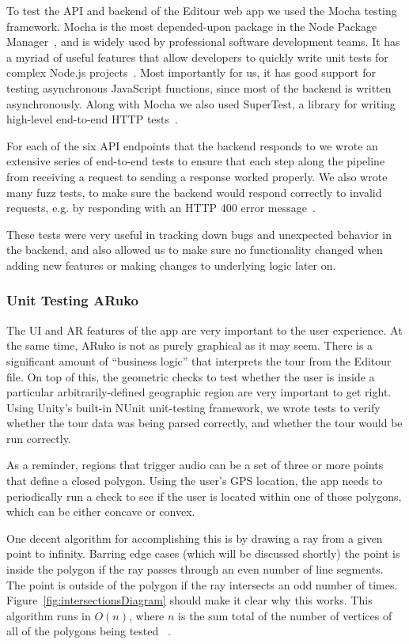 \documentclass[a4paper, 10pt, american, titlepage]{article}
\begin{document}
To test the API and backend of the Editour web app we used the Mocha testing
framework. Mocha is the most depended-upon package in the Node Package
Manager~\autocite{tidelift2019}, and is widely used by professional software
development teams. It has a myriad of useful features that allow developers to
quickly write unit tests for complex Node.js projects~\autocite{mochajs2019}.
Most importantly for us, it has good support for testing asynchronous JavaScript
functions, since most of the backend is written asynchronously. Along with Mocha
we also used SuperTest, a library for writing high-level end-to-end HTTP
tests~\autocite{supertest2019}.

For each of the six API endpoints that the backend responds to we wrote an
extensive series of end-to-end tests to ensure that each step along the pipeline
from receiving a request to sending a response worked properly. We also wrote
many fuzz tests, to make sure the backend would respond correctly to invalid
requests, e.g. by responding with an HTTP 400 error message~\autocite{rfc7231}.

These tests were very useful in tracking down bugs and unexpected behavior in
the backend, and also allowed us to make sure no functionality changed when
adding new features or making changes to underlying logic later on.

\subsubsection{Unit Testing ARuko}
\label{sec:unitTestingARuko}

The UI and AR features of the app are very important to the user experience. At
the same time, ARuko is not as purely graphical as it may seem. There is a
significant amount of ``business logic'' that interprets the tour from the
Editour file. On top of this, the geometric checks to test whether the user is
inside a particular arbitrarily-defined geographic region are very important to
get right.  Using Unity's built-in NUnit unit-testing framework, we wrote tests
to verify whether the tour data was being parsed correctly, and whether the tour
would be run correctly.

As a reminder, regions that trigger audio can be a set of three or more points
that define a closed polygon. Using the user's GPS location, the app needs to
periodically run a check to see if the user is located within one of those
polygons, which can be either concave or convex.

One decent algorithm for accomplishing this is by drawing a ray from a given
point to infinity. Barring edge cases (which will be discussed shortly) the
point is inside the polygon if the ray passes through an even number of line
segments.  The point is outside of the polygon if the ray intersects an odd
number of times. Figure~\ref{fig:intersectionsDiagram} should make it clear why
this works. This algorithm runs in $O(n)$, where $n$ is the sum total of the
number of vertices of all of the polygons being tested
~\autocite{geeksforgeekspolygon}.
\end{document}
